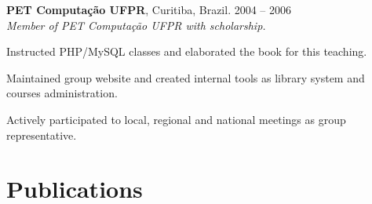 \documentclass[margin,centered,10pt]{resume}
\begin{document}
\begin{resume}
    \textbf{PET Computação UFPR}, Curitiba, Brazil.
    \hfill 2004 – 2006\\
    \textsl{Member of PET Computação UFPR with scholarship.}
    \vspace{-3mm}\\\vspace{-1mm}%
    \begin{list3}
    \item Instructed PHP/MySQL classes and elaborated the book for this teaching.
    \item Maintained group website and created internal tools as library system and courses administration.
    \item Actively participated to local, regional and national meetings as group representative.
    \end{list3}
    \vspace{1.5mm}%
    \sectionline
    \vspace{-3mm}%


    \section{\mysidestyle \textcolor{resumecolor}{Publications}}


\end{resume}
\end{document}
